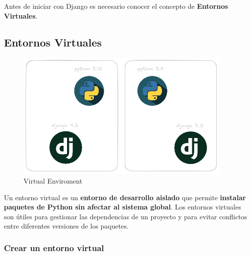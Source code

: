 \documentclass[
  a4paper,
  DIV=11,
  numbers=noendperiod,
  onepage,
  openany]{scrreprt}
\begin{document}
\begin{tcolorbox}[enhanced jigsaw, title=\textcolor{quarto-callout-tip-color}{\faLightbulb}\hspace{0.5em}{Tip}, colback=white, rightrule=.15mm, opacityback=0, colframe=quarto-callout-tip-color-frame, titlerule=0mm, opacitybacktitle=0.6, breakable, coltitle=black, colbacktitle=quarto-callout-tip-color!10!white, bottomtitle=1mm, toptitle=1mm, left=2mm, arc=.35mm, toprule=.15mm, leftrule=.75mm, bottomrule=.15mm]

Antes de iniciar con Django es necesario conocer el concepto de
\textbf{Entornos Virtuales}.

\end{tcolorbox}

\subsection{Entornos Virtuales}\label{entornos-virtuales}

\begin{figure}[H]

{\centering \includegraphics[width=4.16667in,height=\textheight]{images/python-venv.png}

}

\caption{Virtual Enviroment}

\end{figure}%

Un entorno virtual es un \textbf{entorno de desarrollo aislado }que
permite \textbf{instalar paquetes de Python sin afectar al sistema
global}. Los entornos virtuales son útiles para gestionar las
dependencias de un proyecto y para evitar conflictos entre diferentes
versiones de los paquetes.

\subsubsection{Crear un entorno virtual}\label{crear-un-entorno-virtual}
\end{document}
